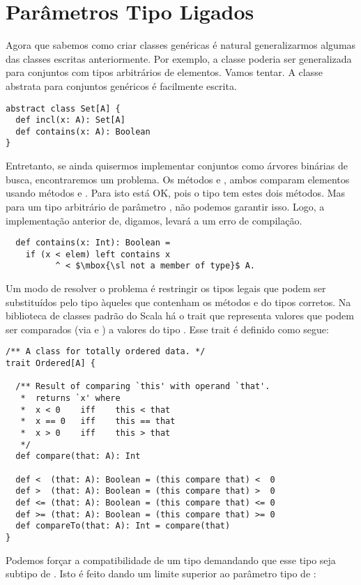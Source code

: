 \section{Parâmetros Tipo Ligados}

Agora que sabemos como criar classes genéricas é natural generalizarmos 
algumas das classes escritas anteriormente. Por exemplo, a classe 
poderia ser generalizada para conjuntos com tipos arbitrários de elementos.
Vamos tentar. A classe abstrata para conjuntos genéricos é facilmente escrita.

\begin{lstlisting}
abstract class Set[A] {
  def incl(x: A): Set[A]
  def contains(x: A): Boolean
}
\end{lstlisting}
Entretanto, se ainda quisermos implementar conjuntos como árvores binárias 
de busca, encontraremos um problema. Os métodos  e , 
ambos comparam elementos usando métodos \code{<} e \code{>}. Para 
isto está OK, pois o tipo  tem estes dois métodos. Mas para um 
tipo arbitrário de parâmetro , não podemos garantir isso. Logo, a 
implementação anterior de, digamos,  levará a um erro de compilação.

\begin{lstlisting}
  def contains(x: Int): Boolean =
    if (x < elem) left contains x
          ^ < $\mbox{\sl not a member of type}$ A.
\end{lstlisting}

Um modo de resolver o problema é restringir os tipos legais que podem ser
substituídos pelo tipo  àqueles que contenham os métodos \code{<} e 
\code{>} do tipos corretos. Na biblioteca de classes padrão do Scala há 
o trait  que representa valores que podem ser comparados (via \code{<}
e \code{>}) a valores do tipo . Esse trait é definido como segue:

\begin{lstlisting}
/** A class for totally ordered data. */
trait Ordered[A] {

  /** Result of comparing `this' with operand `that'.
   *  returns `x' where
   *  x < 0    iff    this < that
   *  x == 0   iff    this == that
   *  x > 0    iff    this > that
   */
  def compare(that: A): Int

  def <  (that: A): Boolean = (this compare that) <  0
  def >  (that: A): Boolean = (this compare that) >  0
  def <= (that: A): Boolean = (this compare that) <= 0
  def >= (that: A): Boolean = (this compare that) >= 0
  def compareTo(that: A): Int = compare(that)
}
\end{lstlisting}
Podemos forçar a compatibilidade de um tipo demandando que esse tipo seja
subtipo de . Isto é feito dando um limite superior ao 
parâmetro tipo de :

